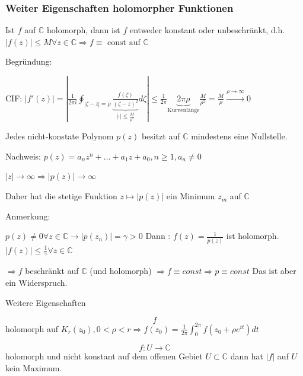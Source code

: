 \documentclass[10pt,a4paper]{article}
\begin{document}
\subsubsection{Weiter Eigenschaften holomorpher Funktionen}

\begin{satz}
Ist $f$ auf $\mathbb{C}$ holomorph, dann ist $f$ entweder konstant oder unbeschränkt, d.h. $|f(z)| \leq M \forall z \in \mathbb{C} \Rightarrow f \equiv \text{ const auf } \mathbb{C}$ 

Begründung:

CIF: $|f'(z)| = \left|  \frac{1}{2 \pi i} \oint_{|\zeta -z|=\rho} \underbrace{\frac{f(\zeta)}{(\zeta-z)^{2}}}_{|\cdot| \leq \frac{M}{\rho^{2}}} d\zeta    \right| \leq \frac{1}{2 \pi} \underbrace{2 \pi \rho}_{\text{Kurvenlänge}} \frac{M}{\rho^{2}} = \frac{M}{\rho} \stackrel{\rho \rightarrow \infty}{\rightarrow} 0$



\end{satz}


\begin{satz}
Jedes nicht-konstate Polynom $p(z)$ besitzt auf $\mathbb{C}$ mindestens eine Nullstelle.

Nachweis: $p(z)= a_n z^{n} + \ldots  + a_1 z + a_0, n \geq 1, a_n \not= 0$

$|z|\rightarrow \infty \Rightarrow |p(z)| \rightarrow \infty$

Daher hat die stetige Funktion $z \longmapsto |p(z)|$ ein Minimum $z_m$ auf $\mathbb{C}$

Anmerkung:

$p(z) \not= 0 \forall z \in  \mathbb{C} \rightarrow |p(z_n)| = \gamma > 0$ Dann : $f(z)=\frac{1}{p(z)}$ ist holomorph. $|f(z)| \leq \frac{1}{\gamma} \forall z \in \mathbb{C}$

$\Rightarrow f$ beschränkt auf $\mathbb{C}$ (und holomorph) $\Rightarrow f \equiv const \Rightarrow p \equiv const$ Das ist aber ein Widerspruch.
\end{satz}


Weitere Eigenschaften

\begin{defi}[Mittelwerteigenschaft]
$$f$$ holomorph auf $K_r(z_0) , 0 < \rho < r \Rightarrow f(z_0) = \frac{1}{2 \pi} \int_{0}^{2\pi} f(z_0+ \rho e^{it}) dt$
\end{defi}

\begin{defi}[Maximumsprinzip]
$$f: U \rightarrow \mathbb{C}$$ holomorph und nicht konstant auf dem offenen Gebiet $U \subset \mathbb{C}$ dann hat $|f|$ auf $U$ kein Maximum.
 \end{defi}
\end{document}
